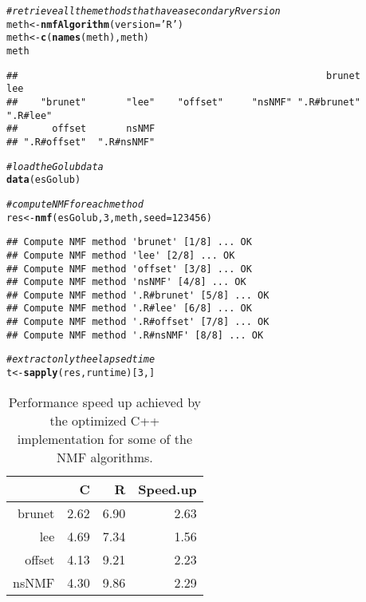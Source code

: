 \documentclass[a4paper]{article}\usepackage[]{graphicx}\usepackage[]{color}
\makeatletter
\newcommand{\hlnum}[1]{\textcolor[rgb]{0.686,0.059,0.569}{#1}}%
\newcommand{\hlstr}[1]{\textcolor[rgb]{0.192,0.494,0.8}{#1}}%
\newcommand{\hlcom}[1]{\textcolor[rgb]{0.678,0.584,0.686}{\textit{#1}}}%
\newcommand{\hlstd}[1]{\textcolor[rgb]{0.345,0.345,0.345}{#1}}%
\newcommand{\hlkwb}[1]{\textcolor[rgb]{0.69,0.353,0.396}{#1}}%
\newcommand{\hlkwc}[1]{\textcolor[rgb]{0.333,0.667,0.333}{#1}}%
\newcommand{\hlkwd}[1]{\textcolor[rgb]{0.737,0.353,0.396}{\textbf{#1}}}%
\newenvironment{kframe}{%
 \def\at@end@of@kframe{}%
 \ifinner\ifhmode%
  \def\at@end@of@kframe{\end{minipage}}%
  \begin{minipage}{\columnwidth}%
 \fi\fi%
 \def\FrameCommand##1{\hskip\@totalleftmargin \hskip-\fboxsep
 \colorbox{shadecolor}{##1}\hskip-\fboxsep
     \hskip-\linewidth \hskip-\@totalleftmargin \hskip\columnwidth}%
 \MakeFramed {\advance\hsize-\width
   \@totalleftmargin\z@ \linewidth\hsize
   \@setminipage}}%
 {\par\unskip\endMakeFramed%
 \at@end@of@kframe}
\newenvironment{knitrout}{}{} %
\makeatother
\begin{document}
\begin{knitrout}
\color{fgcolor}\begin{kframe}
\begin{alltt}
\hlcom{# retrieve all the methods that have a secondary R version}
\hlstd{meth} \hlkwb{<-} \hlkwd{nmfAlgorithm}\hlstd{(}\hlkwc{version}\hlstd{=}\hlstr{'R'}\hlstd{)}
\hlstd{meth} \hlkwb{<-} \hlkwd{c}\hlstd{(}\hlkwd{names}\hlstd{(meth), meth)}
\hlstd{meth}
\end{alltt}
\begin{verbatim}
##                                                      brunet         lee 
##    "brunet"       "lee"    "offset"     "nsNMF" ".R#brunet"    ".R#lee" 
##      offset       nsNMF 
## ".R#offset"  ".R#nsNMF"
\end{verbatim}
\begin{alltt}
\hlcom{# load the Golub data}
\hlkwd{data}\hlstd{(esGolub)}

\hlcom{# compute NMF for each method}
\hlstd{res} \hlkwb{<-} \hlkwd{nmf}\hlstd{(esGolub,} \hlnum{3}\hlstd{, meth,} \hlkwc{seed}\hlstd{=}\hlnum{123456}\hlstd{)}
\end{alltt}
\begin{verbatim}
## Compute NMF method 'brunet' [1/8] ... OK
## Compute NMF method 'lee' [2/8] ... OK
## Compute NMF method 'offset' [3/8] ... OK
## Compute NMF method 'nsNMF' [4/8] ... OK
## Compute NMF method '.R#brunet' [5/8] ... OK
## Compute NMF method '.R#lee' [6/8] ... OK
## Compute NMF method '.R#offset' [7/8] ... OK
## Compute NMF method '.R#nsNMF' [8/8] ... OK
\end{verbatim}
\begin{alltt}
\hlcom{# extract only the elapsed time}
\hlstd{t} \hlkwb{<-} \hlkwd{sapply}\hlstd{(res, runtime)[}\hlnum{3}\hlstd{,]}
\end{alltt}
\end{kframe}
\end{knitrout}

\begin{table}[ht]
\centering
\begin{tabular}{rrrr}
  \hline
 & C & R & Speed.up \\ 
  \hline
brunet & 2.62 & 6.90 & 2.63 \\ 
  lee & 4.69 & 7.34 & 1.56 \\ 
  offset & 4.13 & 9.21 & 2.23 \\ 
  nsNMF & 4.30 & 9.86 & 2.29 \\ 
   \hline
\end{tabular}
\caption{Performance speed up achieved by the optimized C++ implementation for some of the NMF algorithms.} 
\label{tab:perf}
\end{table}
\end{document}
